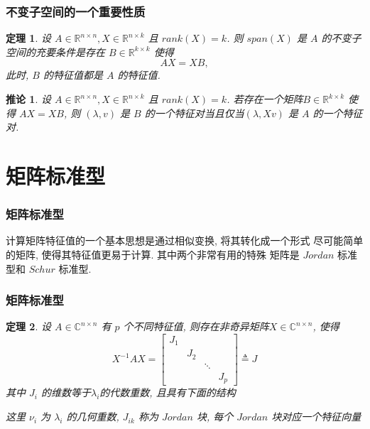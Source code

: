\documentclass[notheorems,serif]{beamer}
\newcommand{\hei}[1]{{\HEI#1}}
\newtheorem{theorem}{\hei{定理}}
\newtheorem{corollary}{\hei{推论}}
\begin{document}
\begin{frame}
\frametitle{不变子空间的一个重要性质}
\begin{theorem}
	设 $A ∈ \mathbb{R}^{n×n}, X ∈ \mathbb{R}^{n×k}$ 且 $rank(X) = k$. 则 $span(X)$ 是 $A$ 的不变子空间的充要条件是存在 $B ∈ \mathbb{R}^{k×k}$ 使得
	$$AX = XB,$$
	此时, $B$ 的特征值都是 $A$ 的特征值. 
\end{theorem}



\begin{corollary}
	设 $A ∈ \mathbb{R}^{n×n}, X ∈ \mathbb{R}^{n×k}$ 且 $rank(X) = k$. 若存在一个矩阵$B ∈ \mathbb{R}^{k×k}$ 使得 $AX = XB$, 则 $(λ, v)$ 是 $B$ 的一个特征对当且仅当$(λ, Xv)$ 是 $A$ 的一个特征对.
\end{corollary}
\end{frame}

\section{矩阵标准型}
\begin{frame}
\frametitle{矩阵标准型}
计算矩阵特征值的一个基本思想是通过相似变换, 将其转化成一个形式
尽可能简单的矩阵, 使得其特征值更易于计算. 其中两个非常有用的特殊
矩阵是 $Jordan$ 标准型和 $Schur$ 标准型.
\end{frame}

\begin{frame}
\frametitle{矩阵标准型}
\begin{theorem}
	设 $A ∈ \mathbb{C}^{n×n}$ 有 $p$ 个不同特征值, 则存在非奇异矩阵$ X ∈ \mathbb{C}^{n×n}$, 使得
	$$
	X^{-1} A X=\left[\begin{array}{cccc}{J_{1}} & {} & {} & {} \\ {} & {J_{2}} & {} \\ {} & {} & {\ddots} & {} \\ {} & {} & {} & {J_{p}}\end{array}\right] \triangleq J
	$$
	其中 $J_i$ 的维数等于$ λ_i $的代数重数, 且具有下面的结构
	
	
	这里 $ν_i$ 为 $λ_i$ 的几何重数, $J_{ik}$ 称为 $Jordan$ 块, 每个 $Jordan$ 块对应一个特征向量	
\end{theorem}
\end{frame}
\end{document}

